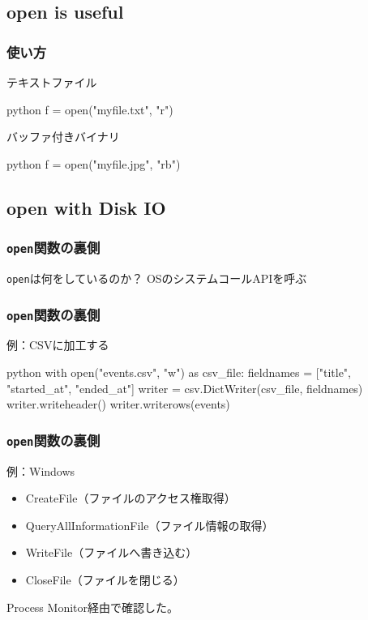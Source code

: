 \documentclass[aspectratio=169,dvipdfmx,14pt,notheorems]{beamer}
\theoremstyle{definition}
\begin{document}
\subsection{open is useful}

\begin{frame}[fragile]\frametitle{使い方}

\begin{exampleblock}{テキストファイル}
\begin{pygments}{python}
f = open("myfile.txt", "r")
\end{pygments}
\end{exampleblock}

\begin{exampleblock}{バッファ付きバイナリ}
\begin{pygments}{python}
f = open("myfile.jpg", "rb")
\end{pygments}
\end{exampleblock}

\end{frame}

\subsection{open with Disk IO}

\begin{frame}\frametitle{\texttt{open}関数の裏側}
\begin{block}{\texttt{open}は何をしているのか？}
OSのシステムコールAPIを呼ぶ
\end{block}
\end{frame}

\begin{frame}[fragile]\frametitle{\texttt{open}関数の裏側}

\begin{exampleblock}{例：CSVに加工する}
\begin{pygments}{python}
with open("events.csv", "w") as csv_file:
    fieldnames = ["title", "started_at", "ended_at"]
    writer = csv.DictWriter(csv_file, fieldnames)
    writer.writeheader()
    writer.writerows(events)
\end{pygments}
\end{exampleblock}

\end{frame}

\begin{frame}[fragile]\frametitle{\texttt{open}関数の裏側}

\begin{exampleblock}{例：Windows}
\begin{itemize}
\item CreateFile（ファイルのアクセス権取得）
\item QueryAllInformationFile（ファイル情報の取得）
\item WriteFile（ファイルへ書き込む）
\item CloseFile（ファイルを閉じる）
\end{itemize}
\end{exampleblock}
Process Monitor経由で確認した。
\end{frame}
\end{document}
